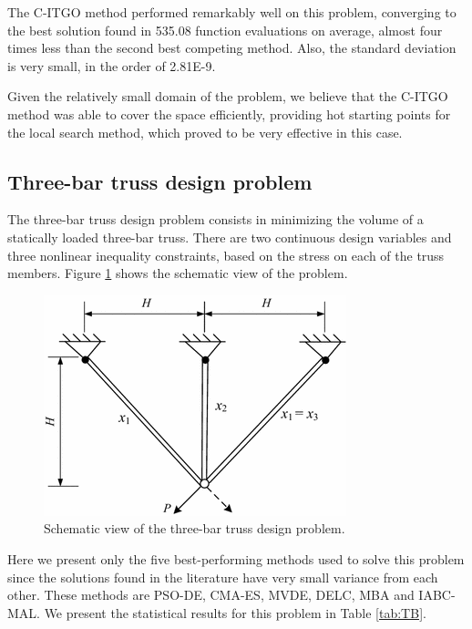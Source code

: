 The C-ITGO method performed remarkably well on this problem, converging to the best solution found in 535.08 function evaluations on average, almost four times less than the second best competing method. Also, the standard deviation is very small, in the order of 2.81E-9. 

Given the relatively small domain of the problem, we believe that the C-ITGO method was able to cover the space efficiently, providing hot starting points for the local search method, which proved to be very effective in this case.




\subsection{Three-bar truss design problem}

The three-bar truss design problem \citep{TB} consists in minimizing the volume of a statically loaded three-bar truss. There are two continuous design variables and three nonlinear inequality constraints, based on the stress on each of the truss members. Figure \ref{fig:TB} shows the schematic view of the problem.

\begin{figure}[h]
\begin{center}
\includegraphics[scale=0.5]{Imgs/TB.png}
\end{center}
\captionsetup{justification=centering}
\caption{Schematic view of the three-bar truss design problem.}\label{fig:TB}
\end{figure}


Here we present only the five best-performing methods used to solve this problem since the solutions found in the literature have very small variance from each other. These methods are PSO-DE, CMA-ES, MVDE, DELC, MBA and IABC-MAL. We present the statistical results for this problem in Table \ref{tab:TB}.

